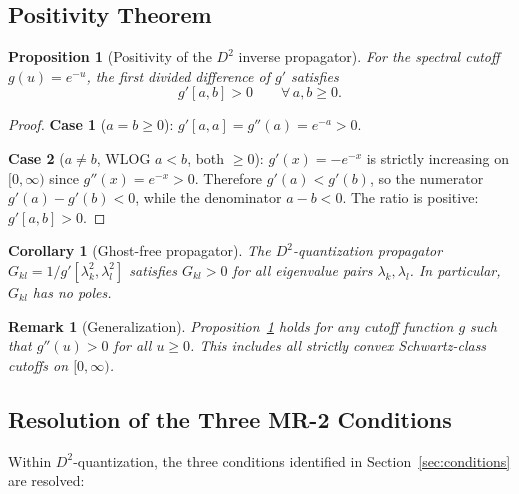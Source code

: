 \documentclass[11pt,a4paper]{article}
\newtheorem{proposition}[theorem]{Proposition}
\newtheorem{corollary}[theorem]{Corollary}
\newtheorem{remark}[theorem]{Remark}
\begin{document}
\subsection{Positivity Theorem}

\begin{proposition}[Positivity of the $D^2$ inverse propagator]
\label{prop:positivity}
For the spectral cutoff $g(u) = e^{-u}$, the first divided difference of
$g'$ satisfies
\begin{equation}
  g'[a, b] > 0 \qquad \forall\, a, b \geq 0.
\end{equation}
\end{proposition}

\begin{proof}
\textbf{Case 1} ($a = b \geq 0$): $g'[a, a] = g''(a) = e^{-a} > 0$.

\smallskip\noindent
\textbf{Case 2} ($a \neq b$, WLOG $a < b$, both $\geq 0$):
$g'(x) = -e^{-x}$ is strictly increasing on $[0, \infty)$ since
$g''(x) = e^{-x} > 0$.  Therefore $g'(a) < g'(b)$, so the numerator
$g'(a) - g'(b) < 0$, while the denominator $a - b < 0$.  The ratio is
positive: $g'[a, b] > 0$.
\end{proof}

\begin{corollary}[Ghost-free propagator]
\label{cor:ghost-free}
The $D^2$-quantization propagator $G_{kl} = 1/g'[\lambda_k^2, \lambda_l^2]$
satisfies $G_{kl} > 0$ for all eigenvalue pairs $\lambda_k, \lambda_l$.
In particular, $G_{kl}$ has \emph{no poles}.
\end{corollary}

\begin{remark}[Generalization]
Proposition~\ref{prop:positivity} holds for any cutoff function $g$ such
that $g''(u) > 0$ for all $u \geq 0$.  This includes all strictly convex
Schwartz-class cutoffs on $[0, \infty)$.
\end{remark}

\subsection{Resolution of the Three MR-2 Conditions}

Within $D^2$-quantization, the three conditions identified in
Section~\ref{sec:conditions} are resolved:
\end{document}
